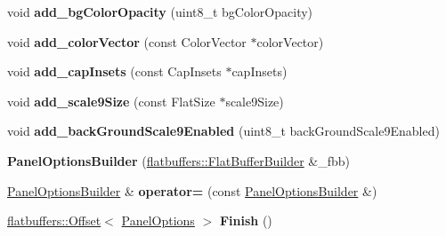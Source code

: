 \begin{DoxyCompactItemize}
\item 
\mbox{\label{structflatbuffers_1_1PanelOptionsBuilder_a03536ec08a293928ae43a0170f7412c7}} 
void {\bfseries add\+\_\+bg\+Color\+Opacity} (uint8\+\_\+t bg\+Color\+Opacity)
\item 
\mbox{\label{structflatbuffers_1_1PanelOptionsBuilder_acd4f41be2edd955e08a4e195f1b1d6b8}} 
void {\bfseries add\+\_\+color\+Vector} (const Color\+Vector $\ast$color\+Vector)
\item 
\mbox{\label{structflatbuffers_1_1PanelOptionsBuilder_adcf866cb51b49d31b70c7e237a6c9085}} 
void {\bfseries add\+\_\+cap\+Insets} (const Cap\+Insets $\ast$cap\+Insets)
\item 
\mbox{\label{structflatbuffers_1_1PanelOptionsBuilder_a14d35e489f4be62fbf9493f70322685c}} 
void {\bfseries add\+\_\+scale9\+Size} (const Flat\+Size $\ast$scale9\+Size)
\item 
\mbox{\label{structflatbuffers_1_1PanelOptionsBuilder_acc9c485b0315b560e1405003a024bad1}} 
void {\bfseries add\+\_\+back\+Ground\+Scale9\+Enabled} (uint8\+\_\+t back\+Ground\+Scale9\+Enabled)
\item 
\mbox{\label{structflatbuffers_1_1PanelOptionsBuilder_a1ea5492e9ebef8d87d9b71a272efe18f}} 
{\bfseries Panel\+Options\+Builder} (\hyperlink{classflatbuffers_1_1FlatBufferBuilder}{flatbuffers\+::\+Flat\+Buffer\+Builder} \&\+\_\+fbb)
\item 
\mbox{\label{structflatbuffers_1_1PanelOptionsBuilder_a6f42d49d22f74fb4de02058d7119f646}} 
\hyperlink{structflatbuffers_1_1PanelOptionsBuilder}{Panel\+Options\+Builder} \& {\bfseries operator=} (const \hyperlink{structflatbuffers_1_1PanelOptionsBuilder}{Panel\+Options\+Builder} \&)
\item 
\mbox{\label{structflatbuffers_1_1PanelOptionsBuilder_a89305f1bd5b3a6a30bfbb364d9d8e4d9}} 
\hyperlink{structflatbuffers_1_1Offset}{flatbuffers\+::\+Offset}$<$ \hyperlink{structflatbuffers_1_1PanelOptions}{Panel\+Options} $>$ {\bfseries Finish} ()

\end{DoxyCompactItemize}
